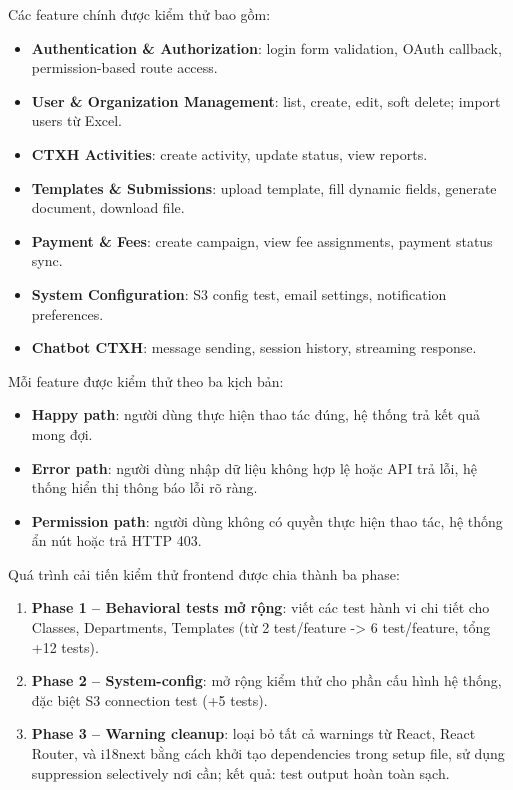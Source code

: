 Các feature chính được kiểm thử bao gồm:
\begin{itemize}
	\item \textbf{Authentication \& Authorization}: login form validation, OAuth callback, permission-based route access.
	\item \textbf{User \& Organization Management}: list, create, edit, soft delete; import users từ Excel.
	\item \textbf{CTXH Activities}: create activity, update status, view reports.
	\item \textbf{Templates \& Submissions}: upload template, fill dynamic fields, generate document, download file.
	\item \textbf{Payment \& Fees}: create campaign, view fee assignments, payment status sync.
	\item \textbf{System Configuration}: S3 config test, email settings, notification preferences.
	\item \textbf{Chatbot CTXH}: message sending, session history, streaming response.
\end{itemize}

Mỗi feature được kiểm thử theo ba kịch bản:
\begin{itemize}
	\item \textbf{Happy path}: người dùng thực hiện thao tác đúng, hệ thống trả kết quả mong đợi.
	\item \textbf{Error path}: người dùng nhập dữ liệu không hợp lệ hoặc API trả lỗi, hệ thống hiển thị thông báo lỗi rõ ràng.
	\item \textbf{Permission path}: người dùng không có quyền thực hiện thao tác, hệ thống ẩn nút hoặc trả HTTP 403.
\end{itemize}

Quá trình cải tiến kiểm thử frontend được chia thành ba phase:
\begin{enumerate}
	\item \textbf{Phase 1 -- Behavioral tests mở rộng}: viết các test hành vi chi tiết cho Classes, Departments, Templates (từ 2 test/feature -> 6 test/feature, tổng +12 tests).
	\item \textbf{Phase 2 -- System-config}: mở rộng kiểm thử cho phần cấu hình hệ thống, đặc biệt S3 connection test (+5 tests).
	\item \textbf{Phase 3 -- Warning cleanup}: loại bỏ tất cả warnings từ React, React Router, và i18next bằng cách khởi tạo dependencies trong setup file, sử dụng suppression selectively nơi cần; kết quả: test output hoàn toàn sạch.
\end{enumerate}

